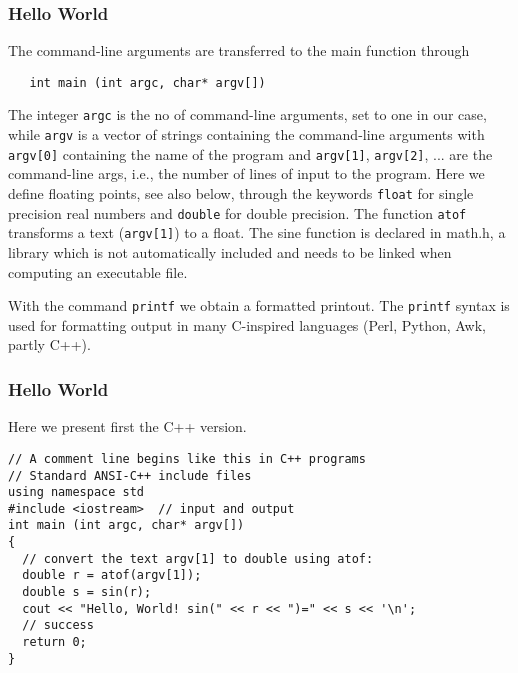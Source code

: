 \documentclass{beamer}
\newenvironment{block_mdfboxadmon}[1][]{\begin{block}{#1}}{\end{block}}
\begin{document}
\begin{frame}
\frametitle{Hello World}

\begin{block_mdfboxadmon}[Dissection II.]
The command-line arguments are transferred to the main function through

\begin{verbatim}
   int main (int argc, char* argv[])
\end{verbatim}
The integer \Verb!argc! is the no of command-line arguments, set to
one in our case, while
\Verb!argv! is a vector of strings containing the command-line arguments
with \Verb!argv[0]! containing  the name of the program
and \Verb!argv[1]!, \Verb!argv[2]!, ... are the command-line args, i.e., the number of
lines of input to the program.
Here we define floating points, see also below,
through the keywords \Verb!float! for single precision real numbers and
\Verb!double! for double precision. The function
\Verb!atof! transforms a text (\Verb!argv[1]!) to a float.
The sine function is declared in math.h, a library which
is not automatically included and needs to be linked when computing
an executable file.

With the command \Verb!printf! we obtain a formatted printout.
The \Verb!printf! syntax is used for formatting output
in many C-inspired languages (Perl, Python, Awk, partly C++).
\end{block_mdfboxadmon}
\end{frame}

\begin{frame}
\frametitle{Hello World}

\begin{block_mdfboxadmon}[Now in C++.]
Here we present first the C++ version.

\begin{verbatim}
// A comment line begins like this in C++ programs
// Standard ANSI-C++ include files
using namespace std
#include <iostream>  // input and output
int main (int argc, char* argv[])
{
  // convert the text argv[1] to double using atof:
  double r = atof(argv[1]);
  double s = sin(r);
  cout << "Hello, World! sin(" << r << ")=" << s << '\n';
  // success
  return 0;
}
\end{verbatim}
\end{block_mdfboxadmon}
\end{frame}
\end{document}
